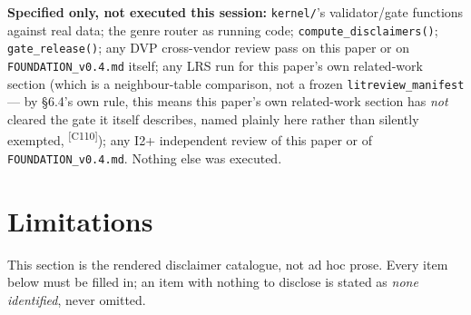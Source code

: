 \documentclass[11pt]{article}
\newcommand{\claimref}[1]{\textsuperscript{[#1]}}
\begin{document}
\textbf{Specified only, not executed this session:} \texttt{kernel/}'s validator/gate functions
against real data; the genre router as running code; \texttt{compute\_disclaimers()};
\texttt{gate\_release()}; any DVP cross-vendor review pass on this paper or on
\texttt{FOUNDATION\_v0.4.md} itself; any LRS run for this paper's own related-work section (which
is a neighbour-table comparison, not a frozen \texttt{litreview\_manifest} --- by \S6.4's own rule,
this means this paper's own related-work section has \emph{not} cleared the gate it itself
describes, named plainly here rather than silently exempted, \claimref{C110}); any I2+ independent
review of this paper or of \texttt{FOUNDATION\_v0.4.md}. Nothing else was executed.

\section{Limitations}
\label{sec:limitations}
\label{sec:disclaimers}
This section is the rendered disclaimer catalogue,
not ad hoc prose. Every item below must be filled in; an item with nothing to
disclose is stated as \emph{none identified}, never omitted.


\end{document}
